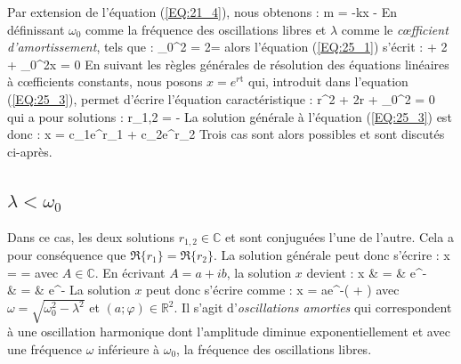 Par extension de l'\'{e}quation (\ref{EQ:21_4}), nous obtenons :
\be
	m = -kx  - \alpha{} \label{EQ:25_1}
\ee
En d\'{e}finissant $\omega_{0}$ comme la fr\'{e}quence des oscillations libres et $\lambda$ comme le \emph{c{\oe}fficient d'amortissement}, tels que :
\be
	\omega_{0}^{2} =  2\lambda = 
\ee
alors l'\'{e}quation (\ref{EQ:25_1}) s'\'{e}crit :
\be
	 + 2\lambda{} + \omega_{0}^{2}x = 0 \label{EQ:25_3}
\ee
En suivant les r\`{e}gles g\'{e}n\'{e}rales de r\'{e}solution des \'{e}quations lin\'{e}aires \`{a} c{\oe}fficients constants, nous posons $x = e^{r\mathrm{t}}$ qui, introduit dans l'{e}quation (\ref{EQ:25_3}), permet d'\'{e}crire l'\'{e}quation caract\'{e}ristique :
\benn
	r^{2} + 2\lambda r + \omega_{0}^{2} = 0
\eenn
qui a pour solutions :
\benn
	r_{1,2} = -\lambda \pm {}
\eenn
La solution g\'{e}n\'{e}rale \`{a} l'\'{e}quation (\ref{EQ:25_3}) est donc :
\benn
	x = c_{1}e^{r_{1}} + c_{2}e^{r_{2}}
\eenn
Trois cas sont alors possibles et sont discut\'{e}s ci-apr\`{e}s.

\subsection{$\lambda < \omega_{0}$}

Dans ce cas, les deux solutions $r_{1,2} \in \mathbb{C}$ et sont conjugu\'{e}es l'une de l'autre. Cela a pour cons\'{e}quence que $\Re{\{r_{1}\}} = \Re{\{r_{2}\}}$. La solution g\'{e}n\'{e}rale peut donc s'\'{e}crire :
\benn
	x =  = 
\eenn
avec $A \in \mathbb{C}$. En \'{e}crivant $A = a+ib$, la solution $x$ devient :
\bea
	x & = & e^{-\lambda{}} \nonumber \\
	& = & e^{-\lambda{}} \nonumber
\eea
La solution $x$ peut donc s'\'{e}crire comme :
\be
	x = ae^{-\lambda{}}\cos(\omega{} + \varphi) \label{EQ:25_4}
\ee
avec $\omega = \sqrt{\omega_{0}^{2} - \lambda^{2}}$ et $(a;\varphi) \in \mathbb{R}^{2}$. Il s'agit d'\emph{oscillations amorties} qui correspondent \`{a} une oscillation harmonique dont l'amplitude diminue exponentiellement et avec une fr\'{e}quence $\omega$ inf\'{e}rieure \`{a} $\omega_{0}$, la fr\'{e}quence des oscillations libres.

